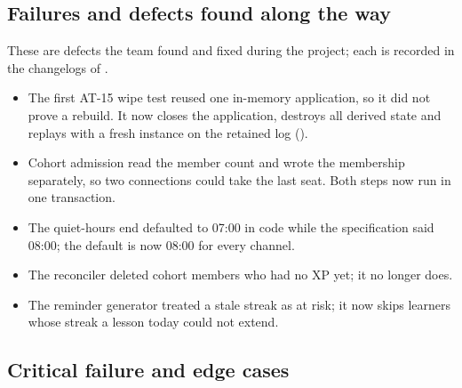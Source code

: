 \documentclass[11pt,a4paper]{article}
\renewcommand{\_}{\textunderscore\allowbreak{}}
\begin{document}
\subsection{Failures and defects found along the way}

These are defects the team found and fixed during the project; each is recorded in the changelogs of .

\begin{itemize}
    \item The first AT-15 wipe test reused one in-memory application, so it did not prove a rebuild. It now closes the application, destroys all derived state and replays with a fresh instance on the retained log ().
    \item Cohort admission read the member count and wrote the membership separately, so two connections could take the last seat. Both steps now run in one  transaction.
    \item The quiet-hours end defaulted to 07:00 in code while the specification said 08:00; the default is now 08:00 for every channel.
    \item The reconciler deleted cohort members who had no XP yet; it no longer does.
    \item The reminder generator treated a stale streak as at risk; it now skips learners whose streak a lesson today could not extend.
\end{itemize}

\subsection{Critical failure and edge cases}
\end{document}
